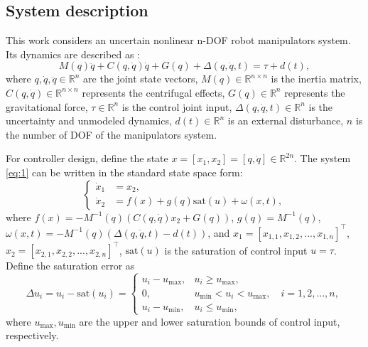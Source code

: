 \documentclass[pdflatex,sn-mathphys-num]{sn-jnl}%
\theoremstyle{thmstyleone}%
\theoremstyle{thmstyletwo}%
\theoremstyle{thmstylethree}%
\begin{document}
\subsection{System description}
\par This work considers an uncertain nonlinear n-DOF robot manipulators system. Its dynamics are described as \cite{SciaviccoSiciliano_2012_ModellingControl,BagheriEtAl_2019_Feedbacklinearization}:
\begin{equation}
	M(q)\ddot{q} + C(q, \dot{q})\dot{q} + G(q)+ \Delta(q, \dot{q}, t)= \tau + d(t),
	\label{eq:1}
\end{equation}
where $ q, \dot{q}, \ddot{q} \in \mathbb{R}^n $ are the joint state vectors, $M(q) \in \mathbb{R}^{n\times n}$ is the inertia matrix, $C(q, \dot{q}) \in \mathbb{R}^{n\times n} $ represents the centrifugal effects, $G(q) \in \mathbb{R}^n $ represents the gravitational force, $\tau \in \mathbb{R}^n$ is the control joint input, $\Delta(q, \dot{q}, t) \in \mathbb{R}^n$ is the uncertainty and unmodeled dynamics, $d(t) \in \mathbb{R}^n$ is an external disturbance, $n$ is the number of DOF of the manipulators system.

For controller design, define the state $x = [x_1,x_2] = [q,\dot{q}] \in \mathbb{R}^{2n}$. The system \cref{eq:1} can be written in the standard state space form:
\begin{equation}
	\left\{
	\begin{aligned}
		\dot{x}_1 & = x_2,     \\
		\dot{x}_2 & =f(x) +g(q) \mathrm{sat}(u) +\omega(x,t),
	\end{aligned}
	\right.
	\label{eq:2}
\end{equation}
where $f(x)=-M^{-1}(q) (C(q,\dot{q})x_2 + G(q)) $, $g(q)=M^{-1}(q)$, $\omega(x,t)=-M^{-1}(q)(\Delta(q,\dot{q},t)-d(t))$, and $x_1=[x_{1,1},x_{1,2},...,x_{1,n}]^{\top}$, $x_2=[x_{2,1},x_{2,2},...,x_{2,n}]^{\top}$, $\mathrm{sat}(u)$ is the saturation of control input $u=\tau$. Define the saturation error as
\begin{equation}\label{eq:3}
\Delta u_{i} =  u_{i}-\mathrm{sat}(u_i)=\begin{cases} 
	u_{i}-u_{\max}, & u_i \geq u_{\max}, \\
0,       & u_{\min} < u_i < u_{\max},  \quad i=1,2,...,n,\\
u_{i}-u_{\min}, & u_i \leq u_{\min},
\end{cases}
\end{equation}
where $u_{\max},u_{\min}$ are the upper and lower saturation bounds of control input, respectively.
\end{document}
